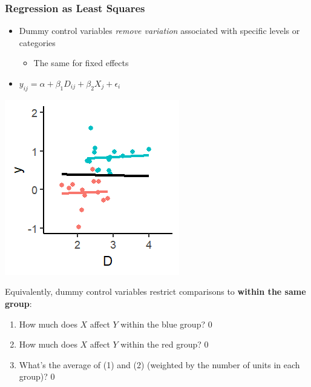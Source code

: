\documentclass[xcolor=x11names,compress]{beamer}\usepackage[]{graphicx}\usepackage[]{color}
\makeatletter
\def\maxwidth{ %
  \ifdim\Gin@nat@width>\linewidth
    \linewidth
  \else
    \Gin@nat@width
  \fi
}
\newenvironment{knitrout}{}{} %
\renewcommand{\(}{\begin{columns}}
\renewcommand{\)}{\end{columns}}
\newcommand{\<}[1]{\begin{column}{#1}}
\renewcommand{\>}{\end{column}}
\makeatother
\begin{document}
\begin{frame}
\frametitle{Regression as Least Squares}
\begin{itemize}
\item Dummy control variables \textit{remove variation} associated with specific levels or categories
\begin{itemize}
\item The same for fixed effects
\end{itemize}
\item $y_{ij} = \alpha + \beta_1 D_{ij} + \beta_2 X_j + \epsilon_i$
\end{itemize}
\begin{multicols}{2}
\begin{knitrout}
\color{fgcolor}
\includegraphics[width=\maxwidth]{figure/graph_ols_FE_last-1} 

\end{knitrout}
\columnbreak
\footnotesize
Equivalently, dummy control variables restrict comparisons to \textbf{within the same group}:
\begin{enumerate}
\item How much does $X$ affect $Y$ within the blue group? 0
\item How much does $X$ affect $Y$ within the red group? 0
\item What's the average of (1) and (2) (weighted by the number of units in each group)? 0
\normalsize
\end{enumerate}
\end{multicols}
\end{frame}
\end{document}
